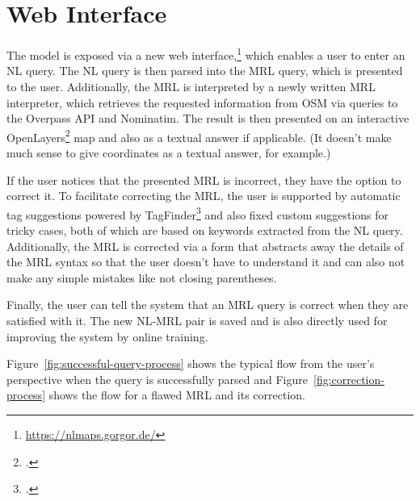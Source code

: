 \chapter{Web Interface}
\label{ch:web-interface}

The model is exposed via a new web
interface,\footnote{\url{https://nlmaps.gorgor.de/}} which enables a user to
enter an NL query. The NL query is then parsed into the MRL query, which is
presented to the user. Additionally, the MRL is interpreted by a newly written
MRL interpreter, which retrieves the requested information from OSM via queries
to the Overpass API and Nominatim. The result is then presented on an
interactive OpenLayers\footcite{openlayers} map and also as a textual answer if
applicable. (It doesn’t make much sense to give coordinates as a textual answer,
for example.)

If the user notices that the presented MRL is incorrect, they have the option to
correct it. To facilitate correcting the MRL, the user is supported by automatic
tag suggestions powered by TagFinder\footcite{tagfinder}
\parencite{gwerder-2014} and also fixed custom suggestions for tricky cases,
both of which are based on keywords extracted from the NL query. Additionally,
the MRL is corrected via a form that abstracts away the details of the MRL
syntax so that the user doesn’t have to understand it and can also not make any
simple mistakes like not closing parentheses.

Finally, the user can tell the system that an MRL query is correct when they are
satisfied with it. The new NL-MRL pair is saved and is also directly used for
improving the system by online training.

Figure~\ref{fig:successful-query-process} shows the typical flow from the user’s
perspective when the query is successfully parsed and
Figure~\ref{fig:correction-process} shows the flow for a flawed MRL and its
correction.

